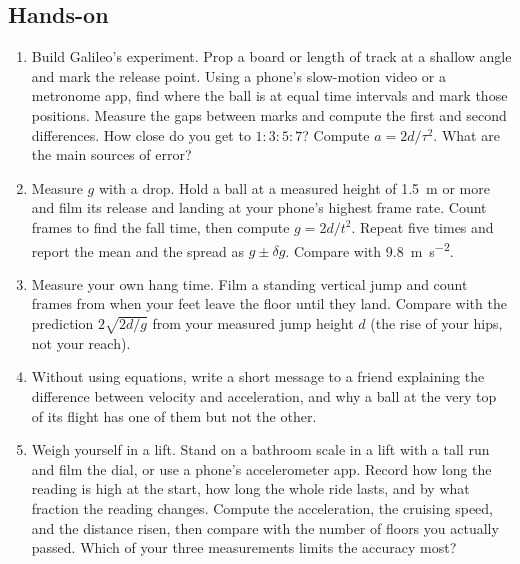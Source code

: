 \documentclass[11pt,twoside,openany]{book}
\begin{document}
\subsection*{Hands-on}
\begin{enumerate}[label=\textbf{\thechapter.\arabic*},resume=exercises,leftmargin=*]
  \item Build Galileo's experiment. Prop a board or length of track at a shallow angle and mark the release point. Using a phone's slow-motion video or a metronome app, find where the ball is at equal time intervals and mark those positions. Measure the gaps between marks and compute the first and second differences. How close do you get to $1:3:5:7$? Compute $a = 2d/\tau^2$. What are the main sources of error?
  \item Measure $g$ with a drop. Hold a ball at a measured height of \SI{1.5}{\metre} or more and film its release and landing at your phone's highest frame rate. Count frames to find the fall time, then compute $g = 2d/t^2$. Repeat five times and report the mean and the spread as $g \pm \delta g$. Compare with \SI{9.8}{\metre\per\second\squared}.
  \item Measure your own hang time. Film a standing vertical jump and count frames from when your feet leave the floor until they land. Compare with the prediction $2\sqrt{2d/g}$ from your measured jump height $d$ (the rise of your hips, not your reach).
  \item Without using equations, write a short message to a friend explaining the difference between velocity and acceleration, and why a ball at the very top of its flight has one of them but not the other.
  \item Weigh yourself in a lift. Stand on a bathroom scale in a lift with a tall run and film the dial, or use a phone's accelerometer app. Record how long the reading is high at the start, how long the whole ride lasts, and by what fraction the reading changes. Compute the acceleration, the cruising speed, and the distance risen, then compare with the number of floors you actually passed. Which of your three measurements limits the accuracy most?
\end{enumerate}
\end{document}
